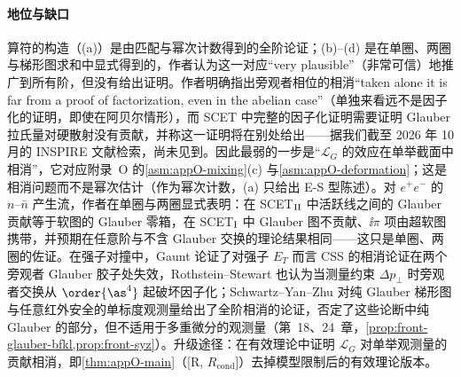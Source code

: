 \paragraph{地位与缺口}
算符的构造（(a)）是由匹配与幂次计数得到的全阶论证；(b)--(d) 是在单圈、两圈与梯形图求和中显式得到的，作者认为这一对应“very plausible”（非常可信）地推广到所有阶，但没有给出证明\cite[第~10.2~节]{RothsteinStewart2016}。作者明确指出旁观者相位的相消“taken alone it is far from a proof of factorization, even in the abelian case”（单独来看远不是因子化的证明，即使在阿贝尔情形）\cite[第~11.1~节]{RothsteinStewart2016}，而 SCET 中完整的因子化证明需要证明 Glauber 拉氏量对硬散射没有贡献，并称这一证明将在别处给出\cite[第~11~节]{RothsteinStewart2016}——据我们截至 2026 年 10 月的 INSPIRE 文献检索，尚未见到。因此最弱的一步是“$\mathcal L_G$ 的效应在单举截面中相消”，它对应附录~O 的\cref{asm:appO-mixing}(c) 与\cref{asm:appO-deformation}；这是相消问题而不是幂次估计（作为幂次计数，(a) 只给出 E-S 型陈述）。对 $e^+e^-$ 的 $n$–$\bar n$ 产生流，作者在单圈与两圈显式表明：在 SCET$_{\rm II}$ 中活跃线之间的 Glauber 贡献等于软图的 Glauber 零箱，在 SCET$_{\rm I}$ 中 Glauber 图不贡献、$\ii\pi$ 项由超软图携带，并预期在任意阶与不含 Glauber 交换的理论结果相同\cite[第~10.1、10.3~节]{RothsteinStewart2016}——这只是单圈、两圈的佐证。在强子对撞中，Gaunt 论证了对强子 $E_T$ 而言 CSS 的相消论证在两个旁观者 Glauber 胶子处失效\cite{Gaunt2014}，Rothstein--Stewart 也认为当测量约束 $\Delta p_\perp$ 时旁观者交换从 $\order{\as^4}$ 起破坏因子化\cite[第~11.1~节]{RothsteinStewart2016}；Schwartz--Yan--Zhu 对纯 Glauber 梯形图与任意红外安全的单标度观测量给出了全阶相消的论证，否定了这些论断中纯 Glauber 的部分，但不适用于多重微分的观测量\cite{Schwartz:2018obd}（第~18、24~章，\cref{prop:front-glauber-bfkl,prop:front-syz}）。升级途径：在有效理论中证明 $\mathcal L_G$ 对单举观测量的贡献相消，即\cref{thm:appO-main}（[R, $R_{\mathrm{cond}}$]）去掉模型限制后的有效理论版本。


